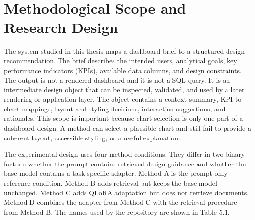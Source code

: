 \section{Methodological Scope and Research Design}

The system studied in this thesis maps a dashboard brief to a structured design recommendation. The brief describes the intended users, analytical goals, key performance indicators (KPIs), available data columns, and design constraints. The output is not a rendered dashboard and it is not a SQL query. It is an intermediate design object that can be inspected, validated, and used by a later rendering or application layer. The object contains a context summary, KPI-to-chart mappings, layout and styling decisions, interaction suggestions, and rationales. This scope is important because chart selection is only one part of a dashboard design. A method can select a plausible chart and still fail to provide a coherent layout, accessible styling, or a useful explanation.

The experimental design uses four method conditions. They differ in two binary factors: whether the prompt contains retrieved design guidance and whether the base model contains a task-specific adapter. Method A is the prompt-only reference condition. Method B adds retrieval but keeps the base model unchanged. Method C adds QLoRA adaptation but does not retrieve documents. Method D combines the adapter from Method C with the retrieval procedure from Method B. The names used by the repository are shown in Table 5.1.


